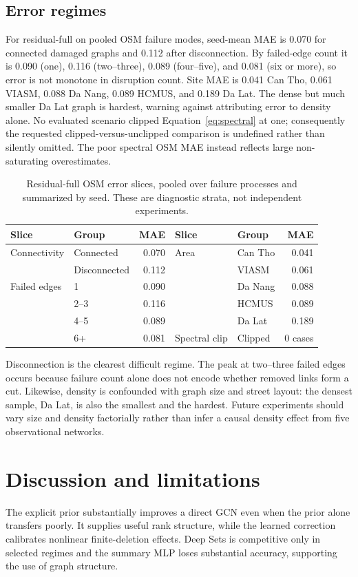 \documentclass[11pt]{amsart}
\begin{document}
\subsection{Error regimes}
For residual-full on pooled OSM failure modes, seed-mean MAE is 0.070 for
connected damaged graphs and 0.112 after disconnection. By failed-edge count it
is 0.090 (one), 0.116 (two--three), 0.089 (four--five), and 0.081 (six or more),
so error is not monotone in disruption count. Site MAE is 0.041 Can Tho, 0.061
VIASM, 0.088 Da Nang, 0.089 HCMUS, and 0.189 Da Lat. The dense but much smaller
Da Lat graph is hardest, warning against attributing error to density alone.
No evaluated scenario clipped Equation~\eqref{eq:spectral} at one; consequently
the requested clipped-versus-unclipped comparison is undefined rather than
silently omitted. The poor spectral OSM MAE instead reflects large
non-saturating overestimates.

\begin{table}[H]
\centering
\caption{Residual-full OSM error slices, pooled over failure processes and
summarized by seed. These are diagnostic strata, not independent experiments.}
\label{tab:error}
\begin{tabular}{llr@{\qquad}llr}
\toprule Slice & Group & MAE & Slice & Group & MAE\\ \midrule
Connectivity&Connected&0.070&Area&Can Tho&0.041\\
&Disconnected&0.112&&VIASM&0.061\\
Failed edges&1&0.090&&Da Nang&0.088\\
&2--3&0.116&&HCMUS&0.089\\
&4--5&0.089&&Da Lat&0.189\\
&6+&0.081&Spectral clip&Clipped&0 cases\\
\bottomrule
\end{tabular}
\end{table}

Disconnection is the clearest difficult regime. The peak at two--three failed
edges occurs because failure count alone does not encode whether removed links
form a cut. Likewise, density is confounded with graph size and street layout:
the densest sample, Da Lat, is also the smallest and the hardest. Future
experiments should vary size and density factorially rather than infer a causal
density effect from five observational networks.

\section{Discussion and limitations}
The explicit prior substantially improves a direct GCN even when the prior
alone transfers poorly. It supplies useful rank structure, while the learned
correction calibrates nonlinear finite-deletion effects. Deep Sets is
competitive only in selected regimes and the summary MLP loses substantial
accuracy, supporting the use of graph structure.
\end{document}
